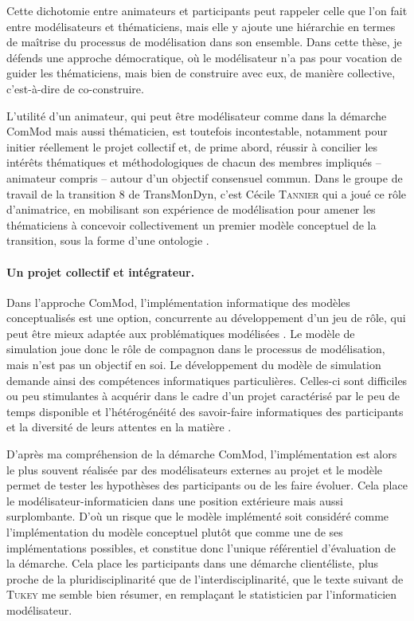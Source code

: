 Cette dichotomie entre \og animateurs\fg{} et \og participants\fg{} peut rappeler celle que l'on fait entre \og modélisateurs\fg{} et \og thématiciens\fg{}, mais elle y ajoute une hiérarchie en termes de maîtrise du processus de modélisation dans son ensemble.
Dans cette thèse, je défends une approche \og démocratique\fg{}, où le modélisateur n'a pas pour vocation de guider les thématiciens, mais bien de construire avec eux, de manière collective, c'est-à-dire de co-construire.

L'utilité d'un \og animateur\fg{}, qui peut être modélisateur comme dans la démarche ComMod mais aussi thématicien, est toutefois incontestable, notamment pour initier réellement le projet collectif et, de prime abord, réussir à concilier les intérêts thématiques et méthodologiques de chacun des membres impliqués -- animateur compris -- autour d'un objectif consensuel commun.
Dans le groupe de travail de la \og transition 8\fg{} de TransMonDyn, c'est Cécile \textsc{Tannier} qui a joué ce rôle d'animatrice, en mobilisant son expérience de modélisation pour amener les thématiciens à concevoir collectivement un premier modèle conceptuel de la transition, sous la forme d'une ontologie \autocite{tannier_ontologie_2014}.

\paragraph{Un projet collectif et intégrateur.}

Dans l'approche ComMod, l'implémentation informatique des modèles conceptualisés est une option, concurrente au développement d'un jeu de rôle, qui peut être mieux adaptée aux problématiques modélisées \autocite[96-97]{etienne_modelisation_2015}.
Le modèle de simulation joue donc le rôle de compagnon dans le processus de modélisation, mais n'est pas un objectif en soi.
Le développement du modèle de simulation demande ainsi des compétences informatiques particulières.
Celles-ci sont difficiles ou peu stimulantes à acquérir dans le cadre d'un projet caractérisé par le \og peu de temps disponible et l'hétérogénéité des savoir-faire informatiques des participants et la diversité de leurs attentes en la matière\fg{} \autocite[29]{etienne_modelisation_2015}.

D'après ma compréhension de la démarche ComMod, l'implémentation est alors le plus souvent réalisée par des modélisateurs externes au projet et le modèle permet de tester les hypothèses des participants ou de les faire évoluer.
Cela place le modélisateur-informaticien dans une position extérieure mais aussi surplombante.
D'où un risque que le modèle implémenté soit considéré comme \og l'implémentation\fg{} du modèle conceptuel plutôt que comme une de ses implémentations possibles, et constitue donc l'unique référentiel d'évaluation de la démarche.
Cela place les participants dans une démarche clientéliste, plus proche de la pluridisciplinarité que de l'interdisciplinarité, que le texte suivant de \textsc{Tukey} me semble bien résumer, en remplaçant le \og statisticien\fg{} par l'\og{}informaticien modélisateur\fg{}.

